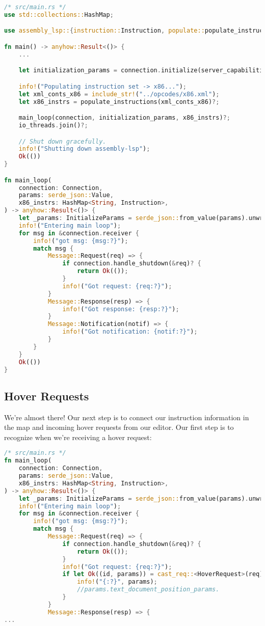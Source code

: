 \begin{lstlisting}[language=rust]
/* src/main.rs */
use std::collections::HashMap;

use assembly_lsp::{instruction::Instruction, populate::populate_instructions};

fn main() -> anyhow::Result<()> {
    ...

    let initialization_params = connection.initialize(server_capabilities)?;

    info!("Populating instruction set -> x86...");
    let xml_conts_x86 = include_str!("../opcodes/x86.xml");
    let x86_instrs = populate_instructions(xml_conts_x86)?;

    main_loop(connection, initialization_params, x86_instrs)?;
    io_threads.join()?;

    // Shut down gracefully.
    info!("Shutting down assembly-lsp");
    Ok(())
}

fn main_loop(
    connection: Connection,
    params: serde_json::Value,
    x86_instrs: HashMap<String, Instruction>,
) -> anyhow::Result<()> {
    let _params: InitializeParams = serde_json::from_value(params).unwrap();
    info!("Entering main loop");
    for msg in &connection.receiver {
        info!("got msg: {msg:?}");
        match msg {
            Message::Request(req) => {
                if connection.handle_shutdown(&req)? {
                    return Ok(());
                }
                info!("Got request: {req:?}");
            }
            Message::Response(resp) => {
                info!("Got response: {resp:?}");
            }
            Message::Notification(notif) => {
                info!("Got notification: {notif:?}");
            }
        }
    }
    Ok(())
}
\end{lstlisting}

\subsection{Hover Requests}

We're almost there! Our next step is to connect our instruction information in the
map and incoming hover requests from our editor. Our first step is to recognize
when we're receiving a hover request:

\begin{lstlisting}[language=rust]
/* src/main.rs */
fn main_loop(
    connection: Connection,
    params: serde_json::Value,
    x86_instrs: HashMap<String, Instruction>,
) -> anyhow::Result<()> {
    let _params: InitializeParams = serde_json::from_value(params).unwrap();
    info!("Entering main loop");
    for msg in &connection.receiver {
        info!("got msg: {msg:?}");
        match msg {
            Message::Request(req) => {
                if connection.handle_shutdown(&req)? {
                    return Ok(());
                }
                info!("Got request: {req:?}");
                if let Ok((id, params)) = cast_req::<HoverRequest>(req) {
                    info!("{:?}", params);
                    //params.text_document_position_params.
                }
            }
            Message::Response(resp) => {
...
\end{lstlisting}

